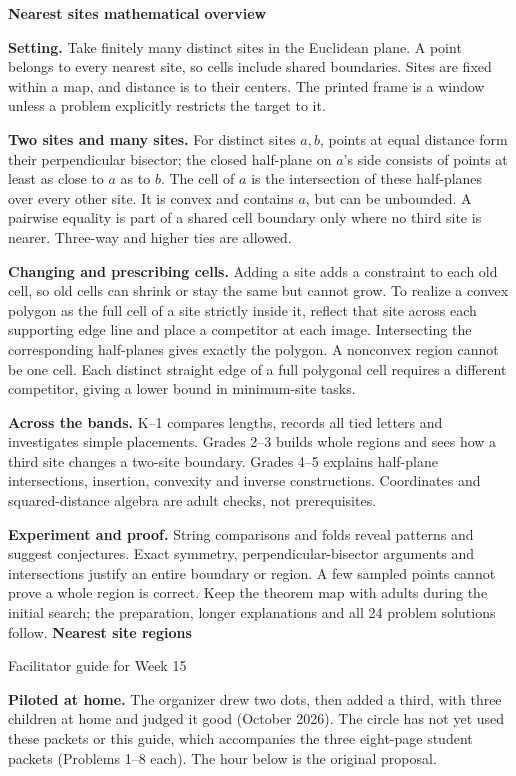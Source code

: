 \documentclass[letterpaper,11pt]{article}
\begin{document}
{\Large\bfseries Nearest sites mathematical overview}\par
\textbf{Setting.} Take finitely many distinct sites in the Euclidean plane. A point belongs to every nearest site, so cells include shared boundaries. Sites are fixed within a map, and distance is to their centers. The printed frame is a window unless a problem explicitly restricts the target to it.

\textbf{Two sites and many sites.} For distinct sites $a,b$, points at equal distance form their perpendicular bisector; the closed half-plane on $a$'s side consists of points at least as close to $a$ as to $b$. The cell of $a$ is the intersection of these half-planes over every other site. It is convex and contains $a$, but can be unbounded. A pairwise equality is part of a shared cell boundary only where no third site is nearer. Three-way and higher ties are allowed.

\textbf{Changing and prescribing cells.} Adding a site adds a constraint to each old cell, so old cells can shrink or stay the same but cannot grow. To realize a convex polygon as the full cell of a site strictly inside it, reflect that site across each supporting edge line and place a competitor at each image. Intersecting the corresponding half-planes gives exactly the polygon. A nonconvex region cannot be one cell. Each distinct straight edge of a full polygonal cell requires a different competitor, giving a lower bound in minimum-site tasks.

\textbf{Across the bands.} K--1 compares lengths, records all tied letters and investigates simple placements. Grades 2--3 builds whole regions and sees how a third site changes a two-site boundary. Grades 4--5 explains half-plane intersections, insertion, convexity and inverse constructions. Coordinates and squared-distance algebra are adult checks, not prerequisites.

\textbf{Experiment and proof.} String comparisons and folds reveal patterns and suggest conjectures. Exact symmetry, perpendicular-bisector arguments and intersections justify an entire boundary or region. A few sampled points cannot prove a whole region is correct. Keep the theorem map with adults during the initial search; the preparation, longer explanations and all 24 problem solutions follow.
\newpage
{\LARGE\bfseries Nearest site regions}\par
{\large Facilitator guide for Week 15}\par
\textbf{Piloted at home.} The organizer drew two dots, then added a third, with three children at home and judged it good (October 2026). The circle has not yet used these packets or this guide, which accompanies the three eight-page student packets (Problems 1--8 each). The hour below is the original proposal.
\end{document}
